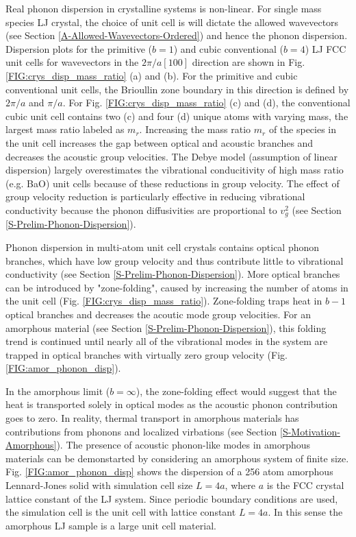 \documentclass[letterpaper,12pt]{article}
\begin{document}
Real phonon dispersion in crystalline systems is non-linear. For single mass species LJ crystal, the choice of unit cell is will dictate the allowed wavevectors (see Section \ref{A-Allowed-Wavevectors-Ordered}) and hence the phonon dispersion. Dispersion plots for the primitive ($b=1$) and cubic conventional ($b=4$) LJ FCC unit cells for wavevectors in the $2\pi/a[100]$ direction are shown in Fig. \ref{FIG:crys_disp_mass_ratio} (a) and (b). For the primitive and cubic conventional unit cells, the Brioullin zone boundary in this direction is defined by $2\pi/a$ and $\pi/a$.  For Fig. \ref{FIG:crys_disp_mass_ratio} (c) and (d), the conventional cubic unit cell contains two (c) and four (d) unique atoms with varying mass, the largest mass ratio labeled as $m_r$. Increasing the mass ratio $m_r$ of the species in the unit cell increases the gap between optical and acoustic branches and decreases the acoustic group velocities.  The Debye model (assumption of linear dispersion) largely overestimates the vibrational conducitivity of high mass ratio (e.g. BaO) unit cells because of these reductions in group velocity.\cite{Toberer2011} The effect of group velocity reduction is particularly effective in reducing vibrational conductivity because the phonon diffusivities are proportional to $v^2_g$ (see Section \ref{S-Prelim-Phonon-Dispersion}).

Phonon dispersion in multi-atom unit cell crystals contains optical phonon branches, which have low group velocity and thus contribute little to vibrational conductivity (see Section \ref{S-Prelim-Phonon-Dispersion}).  More optical branches can be introduced by "zone-folding", caused by increasing the number of atoms in the unit cell (Fig. \ref{FIG:crys_disp_mass_ratio}). Zone-folding traps heat in $b-1$ optical branches and decreases the acoutic mode group velocities.\cite{PhysRev.141.767}  
For an amorphous material (see Section \ref{S-Prelim-Phonon-Dispersion}), this folding trend is continued until nearly all of the vibrational modes in the system are trapped in optical branches with virtually zero group velocity (Fig. \ref{FIG:amor_phonon_disp}). 

In the amorphous limit ($b=\infty$), the zone-folding effect would suggest that the heat is transported solely in optical modes as the acoustic phonon contribution goes to zero.  In reality, thermal transport in amorphous materials has contributions from phonons and localized virbations (see Section \ref{S-Motivation-Amorphous}). The presence of acoustic phonon-like modes in amorphous materials can be demonstarted by considering an amorphous system of finite size. Fig. \ref{FIG:amor_phonon_disp} shows the dispersion of a 256 atom amorphous Lennard-Jones solid with simulation cell size $L=4a$, where $a$ is the FCC crystal lattice constant of the LJ system.  Since periodic boundary conditions are used, the simulation cell is the unit cell with lattice constant $L=4a$. In this sense the amorphous LJ sample is a large unit cell material. 
\end{document}
